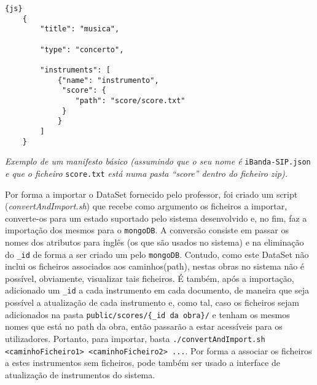 \begin{lstlisting}[frame=single,
                   framesep=3mm,
                   xleftmargin=21pt,
                   tabsize=4]{js}
    {
        "title": "musica",
        
        "type": "concerto",
        
        "instruments": [
            {"name": "instrumento",
             "score": {
                "path": "score/score.txt"
             }
            }
        ]
    }
\end{lstlisting}
\begin{center}
\textit{Exemplo de um manifesto básico (assumindo que o seu nome é} \texttt{iBanda-SIP.json} \textit{e que o ficheiro} \texttt{score.txt} \textit{está numa pasta ``score'' dentro do ficheiro zip).}
\end{center}

Por forma a importar o DataSet fornecido pelo professor, foi criado um script (\textit{convertAndImport.sh}) que recebe como argumento os ficheiros a importar, converte-os para um estado suportado pelo sistema desenvolvido e, no fim, faz a importação dos mesmos para o \texttt{mongoDB}. A conversão consiste em passar os nomes dos atributos para inglês (os que são usados no sistema) e na eliminação do \texttt{\_id} de forma a ser criado um pelo \texttt{mongoDB}. Contudo, como este DataSet não inclui os ficheiros associados aos caminhos(path), nestas obras no sistema não é possível, obviamente, visualizar tais ficheiros. É também, após a importação, adicionado um \texttt{\_id} a cada instrumento em cada documento, de maneira que seja possível a atualização de cada instrumento e, como tal, caso os ficheiros sejam adicionados na pasta \verb|public/scores/{_id da obra}/| e tenham os mesmos nomes que está no path da obra, então passarão a estar acessíveis para os utilizadores. 
Portanto, para importar, basta \verb|./convertAndImport.sh <caminhoFicheiro1> <caminhoFicheiro2> ...|. Por forma a associar os ficheiros a estes instrumentos sem ficheiros, pode também ser usado a interface de atualização de instrumentos do sistema.

